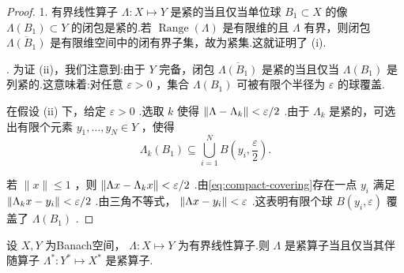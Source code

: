 \begin{proof}
1. 有界线性算子 $\Lambda  : X \mapsto  Y$ 是紧的当且仅当单位球 ${B}_{1} \subset  X$ 的像 $\Lambda \left( {B}_{1}\right)  \subset  Y$ 的闭包是紧的.若 $\operatorname{Range}\left( \Lambda \right)$ 是有限维的且 $\Lambda$ 有界，则闭包 $\overline{\Lambda \left( {B}_{1}\right) }$ 是有限维空间中的闭有界子集，故为紧集.这就证明了 (i).

. 为证 (ii)，我们注意到:由于 $Y$ 完备，闭包 $\overline{\Lambda \left( {B}_{1}\right) }$ 是紧的当且仅当 $\Lambda \left( {B}_{1}\right)$ 是列紧的.这意味着:对任意 $\varepsilon  > 0$ ，集合 $\Lambda \left( {B}_{1}\right)$ 可被有限个半径为 $\varepsilon$ 的球覆盖.

在假设 (ii) 下，给定 $\varepsilon  > 0$ .选取 $k$ 使得 $\norm{\Lambda  - {\Lambda }_{k}} < \varepsilon /2$ .由于 ${\Lambda }_{k}$ 是紧的，可选出有限个元素 ${y}_{1},\ldots ,{y}_{N} \in  Y$ ，使得
\begin{equation}\tag{4.7}\label{eq:compact-covering}
{\Lambda }_{k}\left( {B}_{1}\right)  \subseteq  \mathop{\bigcup }\limits_{{i = 1}}^{N}B\left( {{y}_{i},\frac{\varepsilon }{2}}\right) .
\end{equation}

若 $\| x\|  \leq  1$ ，则 $\norm{{\Lambda x} - {\Lambda }_{k}x} < \varepsilon /2$ .由\eqref{eq:compact-covering}存在一点 ${y}_{i}$ 满足 $\norm{{\Lambda }_{k}x - {y}_{i}} < \varepsilon /2$ .由三角不等式， $\norm{{\Lambda x} - {y}_{i}} < \varepsilon$ .这表明有限个球 $B\left( {{y}_{i},\varepsilon }\right)$ 覆盖了 $\Lambda \left( {B}_{1}\right)$ .
\end{proof}

\begin{theorem}[紧算子的伴随算子]\label{thm:compact-adjoint}
设 $X,Y$ 为Banach空间， $\Lambda  : X \mapsto  Y$ 为有界线性算子.则 $\Lambda$ 是紧算子当且仅当其伴随算子 ${\Lambda }^{ * } : {Y}^{ * } \mapsto  {X}^{ * }$ 是紧算子.
\end{theorem}

